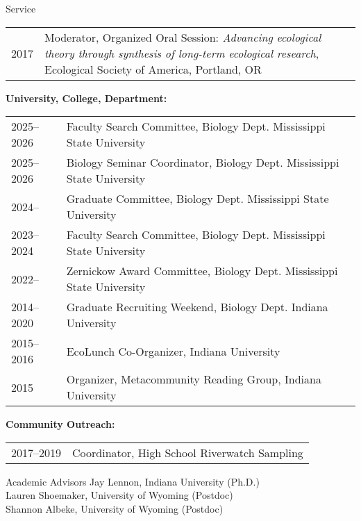 \documentclass{resume} %
\begin{document}
\begin{rSection}{Service}
{\begin{xltabular}{0.95\textwidth}{l>{\raggedright\arraybackslash}X}
2017 & Moderator, Organized Oral Session: {\em Advancing ecological theory through synthesis of long-term ecological research}, Ecological Society of America, Portland, OR\\
\end{xltabular}
}

{\bf University, College, Department:}
{\def\arraystretch{1}
\begin{xltabular}{0.95\textwidth}{l>{\raggedright\arraybackslash}X}
2025--2026 & Faculty Search Committee, Biology Dept. Mississippi State University\\

2025--2026 & Biology Seminar Coordinator, Biology Dept. Mississippi State University\\

2024-- & Graduate Committee, Biology Dept. Mississippi State University\\

2023--2024 & Faculty Search Committee, Biology Dept. Mississippi State University\\

2022-- & Zernickow Award Committee, Biology Dept. Mississippi State University\\

2014--2020 & Graduate Recruiting Weekend, Biology Dept. Indiana University\\

2015--2016 & EcoLunch Co-Organizer, Indiana University\\

2015 & Organizer, Metacommunity Reading Group, Indiana University\\

\end{xltabular}
}

{\bf Community Outreach:}
{\def\arraystretch{1}
\begin{xltabular}{0.95\textwidth}{l>{\raggedright\arraybackslash}X}
2017--2019 & Coordinator, High School Riverwatch Sampling\\
\end{xltabular}
}


\end{rSection}


\begin{rSection}{Academic Advisors}
Jay Lennon, Indiana University (Ph.D.) \\
Lauren Shoemaker, University of Wyoming (Postdoc) \\
Shannon Albeke, University of Wyoming (Postdoc) 
\end{rSection}
\bigskip
\end{document}
